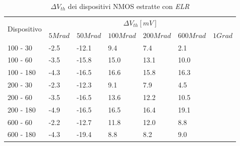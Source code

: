 \documentclass[12pt, letterpaper]{book}
\begin{document}
\begin{table}[H]
  \renewcommand{\arraystretch}{1.3}
  \begin{tabular}{m{2cm}  m{1.1cm} m{1.3cm} m{1.5cm} m{1.5cm} m{1.5cm} m{1cm}}
    \toprule
    \multirow{2}{*}{Dispositivo} & \multicolumn{6}{c}{$\Delta V_{th} [mV] $}                                                          \\
    \cmidrule{2-7}
                                 & $5Mrad$                            & $50Mrad$ & $100Mrad$ & $200Mrad$ & $600Mrad$ & $1Grad$ \\
    \midrule
    100 - 30                     & -2.5                               & -12.1    & 9.4       & 7.4       & 2.1       &         \\
    \hline
    100 - 60                     & -3.5                               & -15.8    & 15.0      & 13.1      & 10.0      &         \\
    \hline
    100 - 180                     & -4.3                               & -16.5    & 16.6      & 15.8      & 16.3      &         \\
    \hline
    200 - 30                     & -2.3                               & -12.3    & 9.1       & 7.9       & 4.5       &         \\
    \hline
    200 - 60                    & -3.5                               & -16.5    & 13.6      & 12.2      & 10.5      &         \\
    \hline
    200 - 180                     & -4.9                               & -16.5    & 16.5      & 16.4      & 19.1      &         \\
    \hline
    600 - 60                     & -2.2                               & -12.7    & 11.8      & 12.0      & 8.8       &         \\
    \hline
    600 - 180                    & -4.3                               & -19.4    & 8.8       & 8.2       & 9.0       &         \\
    \bottomrule
  \end{tabular}
  \caption{$\Delta V_{th}$ dei dispositivi NMOS estratte con \emph{ELR}}
  \label{tab:deltaVthELRN}
\end{table}
\end{document}
